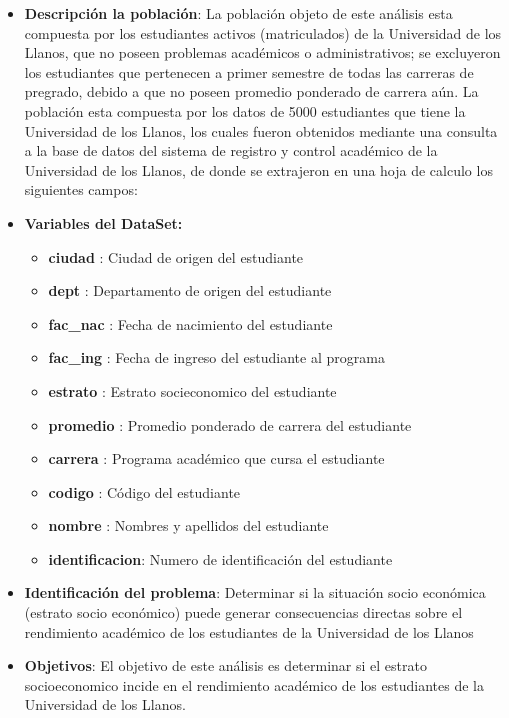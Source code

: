   
  \begin{itemize}
   \item \textbf{Descripción la población}: La población objeto de este análisis esta compuesta por los estudiantes activos (matriculados) de la Universidad de los Llanos, que no poseen problemas académicos o administrativos; se excluyeron los estudiantes que pertenecen a primer semestre de todas las carreras de pregrado, debido a que no poseen promedio ponderado de carrera aún. 
   \bigskip
   La población esta compuesta por los datos de 5000 estudiantes que tiene la Universidad de los Llanos, los cuales fueron obtenidos mediante una consulta a la base de datos del sistema de registro y control académico de la Universidad de los Llanos, de donde se extrajeron en una hoja de calculo los siguientes campos:
   
   \item \textbf{Variables del DataSet:}\\
    
   \begin{itemize}
	   \item \textbf{ciudad}  	: Ciudad de origen del estudiante
	   \item \textbf{dept} 	: Departamento de origen del estudiante
	   \item \textbf{fac\_nac} : Fecha de nacimiento del estudiante
	   \item \textbf{fac\_ing} : Fecha de ingreso del estudiante al programa
	   \item \textbf{estrato}	: Estrato socieconomico del estudiante
	   \item \textbf{promedio} : Promedio ponderado de carrera del estudiante
	   \item \textbf{carrera}  : Programa académico que cursa el estudiante
	   \item \textbf{codigo}   : Código del estudiante
	   \item \textbf{nombre}   : Nombres y apellidos del estudiante
	   \item \textbf{identificacion}: Numero de identificación del estudiante
	\end{itemize}
   
    \item \textbf{Identificación del problema}: Determinar si la situación socio económica (estrato socio económico) puede generar consecuencias directas sobre el rendimiento académico de los estudiantes de la Universidad de los Llanos\\ 
    
   \item \textbf{Objetivos}: El objetivo de este análisis es determinar si el estrato socioeconomico incide en el rendimiento académico de los estudiantes de la Universidad de los Llanos.
  \end{itemize}
